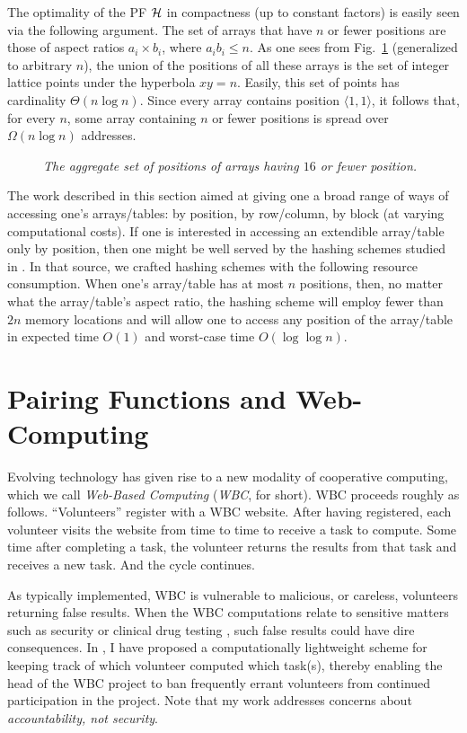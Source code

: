 The optimality of the PF $\mbox{$\cal H$}$ in compactness (up to constant factors)
is easily seen via the following argument.  The set of arrays that
have $n$ or fewer positions are those of aspect ratios $a_i \times
b_i$, where $a_i b_i \leq n$.  As one sees from Fig.~\ref{f.hyp}
(generalized to arbitrary $n$), the union of the positions of all
these arrays is the set of integer lattice points under the hyperbola
$xy = n$.  Easily, this set of points has cardinality $\Theta(n \log
n)$.  Since every array contains position $\langle 1,1 \rangle$, it
follows that, for every $n$, some array containing $n$ or fewer
positions is spread over $\Omega(n \log n)$ addresses.
\begin{figure}[htb]
\centerline{}
\caption{{\it The aggregate set of positions of arrays having $16$ or
fewer position.}
\label{f.hyp}}
\end{figure}

The work described in this section aimed at giving one a broad range
of ways of accessing one's arrays/tables: by position, by row/column,
by block (at varying computational costs).  If one is interested in
accessing an extendible array/table only by position, then one might
be well served by the hashing schemes studied in \cite{RosenbergS77}.
In that source, we crafted hashing schemes with the following resource
consumption.  When one's array/table has at most $n$ positions, then,
no matter what the array/table's aspect ratio, the hashing scheme will
employ fewer than $2n$ memory locations and will allow one to access
any position of the array/table in expected time $O(1)$ and worst-case
time $O(\log \log n)$.

\section{Pairing Functions and Web-Computing}
\label{s.webcomp}

\setcounter{equation}{0}

Evolving technology has given rise to a new modality of cooperative
computing, which we call {\it Web-Based Computing} ({\it WBC}, for
short).  WBC proceeds roughly as follows.  ``Volunteers'' register
with a WBC website.  After having registered, each volunteer visits
the website from time to time to receive a task to compute.  Some time
after completing a task, the volunteer returns the results from that
task and receives a new task.  And the cycle continues.

As typically implemented, WBC is vulnerable to malicious, or careless,
volunteers returning false results.  When the WBC computations relate
to sensitive matters such as security \cite{RSAbyWeb95} or clinical
drug testing \cite{Intel01,Olson01}, such false results could have
dire consequences.  In \cite{Rosenberg02}, I have proposed a
computationally lightweight scheme for keeping track of which
volunteer computed which task(s), thereby enabling the head of the WBC
project to ban frequently errant volunteers from continued
participation in the project.  Note that my work addresses concerns
about {\em accountability, not security}.

